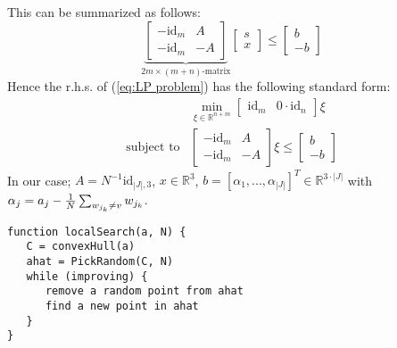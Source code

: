\documentclass[10pt,a4paper]{article}
\newcommand{\R}{\mathbb{R}}
\newcommand{\id}{\text{id}}
\begin{document}
	This can be summarized as follows:
	\begin{equation}
	\underbrace{
		\begin{bmatrix}
		-\id_{m} & A\\
		-\id_{m} & -A
		\end{bmatrix}
	}_{\text{$2m\times (m+n)$-matrix}}
	\begin{bmatrix}
	s\\ x
	\end{bmatrix} \leq 
	\begin{bmatrix}
	b\\
	-b
	\end{bmatrix}
	\end{equation}
	Hence the r.h.s. of (\ref{eq:LP problem}) has the following standard form:
	\begin{align*}
	&\min_{\xi \in \R^{n+m}} \begin{bmatrix}
	\id_{m} & 0 \cdot \id_{n}
	\end{bmatrix} \xi\\
	\text{subject to}& \begin{bmatrix}
	-\id_{m} & A\\
	-\id_{m} & -A
	\end{bmatrix} 
	\xi \leq 
	\begin{bmatrix}
	b\\
	-b
	\end{bmatrix}
	\end{align*}
	In our case; $A = N^{-1} \text{id}_{|J|,3}$, $x \in \R^3$, $b = [\alpha_1, ..., \alpha_{|J|}]^T \in \R^{3\cdot |J|}$ with $\alpha_j = a_j - {1 \over N} \sum_{w_{j_k} \neq v} w_{j_k}$.
	\begin{lstlisting}[caption={A algorithm to find a local solution},basicstyle=\small]
function localSearch(a, N) {
   C = convexHull(a)
   ahat = PickRandom(C, N)
   while (improving) {
      remove a random point from ahat
      find a new point in ahat
   }
}
	\end{lstlisting}
	
\end{document}
